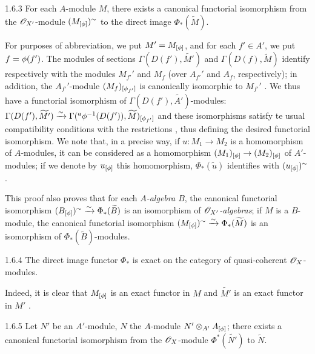 \begin{envs}[Proposition]{1.6.3}
\label{prop-1.1.6.3}
For each $A$-module $M$, there exists a canonical functorial isomorphism from the
$\mathscr{O}_{X'}$-module $(M_{[\phi]})^\sim$ to the direct image $\Phi_*(\widetilde{M})$.
\end{envs}

For purposes of abbreviation, we put $M'=M_{[\phi]}$, and for each $f'\in A'$, we put
$f=\phi(f')$. The modules of sections $\Gamma(D(f'),\widetilde{M'})$ and
$\Gamma(D(f),\widetilde{M})$ identify respectively with the modules $M_{f'}'$ and $M_f$
(over $A_{f'}'$ and $A_f$, respectively); in addition, the $A_{f'}'$-module
$(M_f)_{[\phi_{f'}]}$ is canonically isomorphic to $M_{f'}'$ . We thus have
a functorial isomorphism of $\Gamma(D(f'),\widetilde{A'})$-modules:
$\Gamma(D(f'),\widetilde{M'})
\xrightarrow{\sim}\Gamma({}^a\phi^{-1}(D(f')),\widetilde{M})_{[\phi_{f'}]}$
and these isomorphisms satisfy te usual compatibility conditions with the restrictions
, thus defining the desired functorial isomorphism. We note that, in a
precise way, if $u:M_1\to M_2$ is a homomorphism of $A$-modules, it can be considered as a
homomorphism $(M_1)_{[\phi]}\to(M_2)_{[\phi]}$ of $A'$-modules; if we denote by
$u_{[\phi]}$ this homomorphism, $\Phi_*(\widetilde{u})$ identifies with
$(u_{[\phi]})^\sim$.

This proof also proves that for each \emph{$A$-algebra $B$}, the canonical functorial
isomorphism
$(B_{[\phi]})^\sim\xrightarrow{\sim}\Phi_*(\widetilde{B})$ is an isomorphism of
\emph{$\mathscr{O}_{X'}$-algebras}; if $M$ is a $B$-module, the canonical functorial isomorphism
$(M_{[\phi]})^\sim\xrightarrow{\sim}\Phi_*(\widetilde{M})$ is an isomorphism of
$\Phi_*(\widetilde{B})$-modules.

\begin{envs}[Corollary]{1.6.4}
\label{cor-1.1.6.4}
The direct image functor $\Phi_*$ is exact on the category of quasi-coherent $\mathscr{O}_X$-modules.
\end{envs}

Indeed, it is clear that $M_{[\phi]}$ is an exact functor in $M$ and $\widetilde{M'}$ is an
exact functor in $M'$ .

\begin{envs}[Proposition]{1.6.5}
\label{prop-1.1.6.5}
Let $N'$ be an $A'$-module, $N$ the $A$-module $N'\otimes_{A'}A_{[\phi]}$; there exists a
canonical functorial isomorphism from the $\mathscr{O}_X$-module $\Phi^*(\widetilde{N'})$ to
$\widetilde{N}$.
\end{envs}

